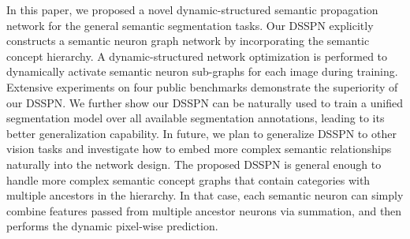\documentclass[10pt,twocolumn,letterpaper]{article}
\begin{document}
In this paper, we proposed a novel dynamic-structured semantic propagation network for the general semantic segmentation tasks. Our DSSPN explicitly constructs a semantic neuron graph network by incorporating the semantic concept hierarchy. A dynamic-structured network optimization is performed to dynamically activate semantic neuron sub-graphs for each image during training. Extensive experiments on four public benchmarks demonstrate the superiority of our DSSPN. We further show our DSSPN can be naturally used to train a unified segmentation model over all available segmentation annotations, leading to its better generalization capability. In future, we plan to generalize DSSPN to other vision tasks and investigate how to embed more complex semantic relationships naturally into the network design. The proposed DSSPN is general enough to handle more complex semantic concept graphs that contain categories with multiple ancestors in the hierarchy. In that case,
each semantic neuron can simply combine features passed
from multiple ancestor neurons via summation, and then
performs the dynamic pixel-wise prediction.

\label{sec:exp}
{\small


}
\end{document}
